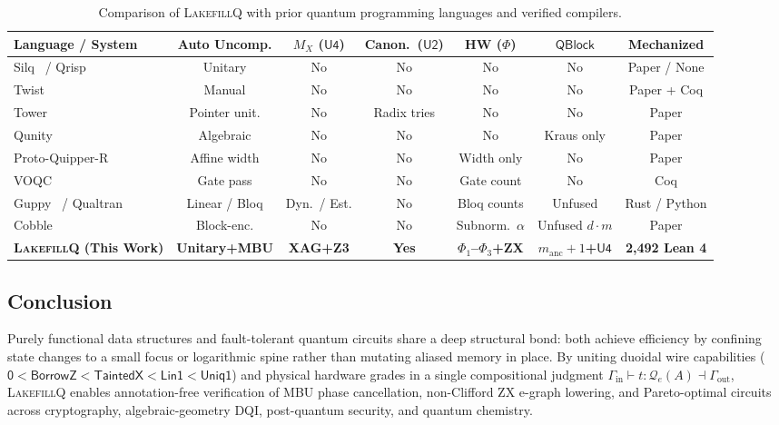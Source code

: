 \documentclass[acmsmall,screen,anonymous]{acmart}
\DeclareRobustCommand{\_}{\ifmmode\text{\char95}\else\char95\penalty0\relax\fi}
\theoremstyle{plain}
\newcommand{\LakefillQ}{\textsc{LakefillQ}}
\newcommand{\QBlock}{\ensuremath{\mathsf{QBlock}}}
\newcommand{\CapZero}{\ensuremath{\mathsf{0}}}
\newcommand{\CapBorrowZ}{\ensuremath{\mathsf{BorrowZ}}}
\newcommand{\CapTaintedX}{\ensuremath{\mathsf{TaintedX}}}
\newcommand{\CapLin}{\ensuremath{\mathsf{Lin1}}}
\newcommand{\CapUniq}{\ensuremath{\mathsf{Uniq1}}}
\begin{document}
\begin{table}[t]
\centering
\caption{Comparison of \LakefillQ{} with prior quantum programming languages and verified compilers.}
\label{tab:t15}
\footnotesize
\setlength{\tabcolsep}{4pt}
\begin{tabular}{lcccccc}
\toprule
Language / System & Auto Uncomp. & $M_X$ ($\mathsf{U4}$) & Canon.\ ($\mathsf{U2}$) & HW ($\Phi$) & $\QBlock$ & Mechanized \\
\midrule
Silq~\cite{bichsel2020} / Qrisp~\cite{seidel2024} & Unitary & No & No & No & No & Paper / None \\
Twist~\cite{yuan2022twist} & Manual & No & No & No & No & Paper + Coq \\
Tower~\cite{yuan2022tower} & Pointer unit. & No & Radix tries & No & No & Paper \\
Qunity~\cite{voichick2023} & Algebraic & No & No & No & Kraus only & Paper \\
Proto-Quipper-R~\cite{colledan2025protoquipperr} & Affine width & No & No & Width only & No & Paper \\
VOQC~\cite{hietala2021} & Gate pass & No & No & Gate count & No & Coq \\
Guppy~\cite{koch2025} / Qualtran~\cite{harrigan2024} & Linear / Bloq & Dyn.\ / Est. & No & Bloq counts & Unfused & Rust / Python \\
Cobble~\cite{cobble2026} & Block-enc. & No & No & Subnorm.\ $\alpha$ & Unfused $d{\cdot}m$ & Paper \\
\textbf{\LakefillQ{} (This Work)} & \textbf{Unitary+MBU} & \textbf{XAG+Z3} & \textbf{Yes} & \textbf{$\Phi_1$--$\Phi_3$+ZX} & \textbf{$m_{\mathrm{anc}}{+}1$+$\mathsf{U4}$} & \textbf{2,492 Lean 4} \\
\bottomrule
\end{tabular}
\end{table}

\subsection{Conclusion}
\label{sec:conclusion}

Purely functional data structures and fault-tolerant quantum circuits share a deep structural bond: both achieve efficiency by confining state changes to a small focus or logarithmic spine rather than mutating aliased memory in place. By uniting duoidal wire capabilities ($\CapZero < \CapBorrowZ < \CapTaintedX < \CapLin < \CapUniq$) and physical hardware grades in a single compositional judgment $\Gamma_{\mathrm{in}} \vdash t : \mathcal{Q}_{e}(A) \dashv \Gamma_{\mathrm{out}}$, \LakefillQ{} enables annotation-free verification of MBU phase cancellation, non-Clifford ZX e-graph lowering, and Pareto-optimal circuits across cryptography, algebraic-geometry DQI, post-quantum security, and quantum chemistry.
\end{document}
